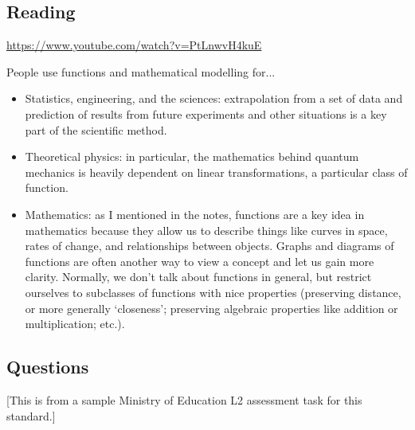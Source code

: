 



\subsection*{Reading}
\begin{center}
\begin{tcolorbox}[width=0.8\textwidth,colback={white},title={\textbf{Go and watch...}},colbacktitle=black,coltitle=white]
  \textcolor{black}{\url{https://www.youtube.com/watch?v=PtLnwvH4kuE}}
\end{tcolorbox}
\end{center}

\begin{center}
\begin{tcolorbox}[width=0.8\textwidth,colback={white},title={\textbf{What's it good for?}},colbacktitle=MidnightBlue,coltitle=white]
  People use functions and mathematical modelling for...
  \begin{itemize}
    \item Statistics, engineering, and the sciences: extrapolation from a set of data and prediction of results from future experiments
          and other situations is a key part of the scientific method.
    \item Theoretical physics: in particular, the mathematics behind quantum mechanics is heavily dependent on linear transformations,
          a particular class of function.
    \item Mathematics: as I mentioned in the notes, functions are a key idea in mathematics because they allow us to describe things
          like curves in space, rates of change, and relationships between objects. Graphs and diagrams of functions are often another
          way to view a concept and let us gain more clarity. Normally, we don't talk about functions in general, but restrict ourselves
          to subclasses of functions with nice properties (preserving distance, or more generally `closeness'; preserving algebraic properties
          like addition or multiplication; etc.).
  \end{itemize}
\end{tcolorbox}
\end{center}

\subsection*{Questions}
[This is from a sample Ministry of Education L2 assessment task for this standard.]

